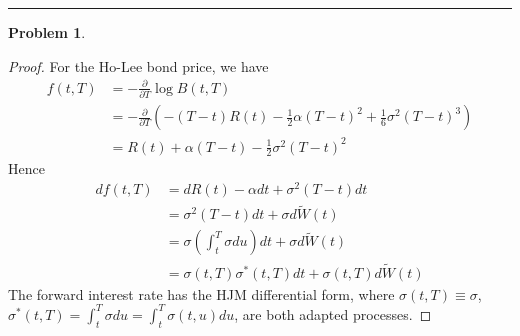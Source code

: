 \documentclass[a4paper, 10pt]{article}
\theoremstyle{definition}
\newtheorem{problem}{Problem}
\theoremstyle{hSol}
\begin{document}
\noindent\rule{16cm}{0.4pt}
\begin{problem} 
\end{problem}
\begin{proof} For the Ho-Lee bond price, we have
\begin{equation}
  \begin{split}
    f(t,T) &= -\frac{\partial }{\partial T}\log B(t,T) \\
    &= -\frac{\partial }{\partial T} \left(-(T-t)R(t)-\frac{1}{2}\alpha (T-t)^2 + \frac{1}{6}\sigma^2(T-t)^3\right) \\
    &= R(t) + \alpha(T-t) - \frac{1}{2}\sigma^2(T-t)^2
  \end{split}
\end{equation}
Hence
\begin{equation}
  \begin{split}
    df(t,T) &= dR(t) - \alpha dt + \sigma^2(T-t) dt  \\
  &= \sigma^2(T-t) dt + \sigma d \widetilde{W}(t) \\ 
  &= \sigma \left(\int_t^T\sigma du\right) dt + \sigma d \widetilde{W}(t)\\
  &= \sigma(t,T)\sigma^*(t,T) dt + \sigma(t,T) d \widetilde{W}(t)
  \end{split}
\end{equation}
The forward interest rate has the HJM differential form, where $\sigma(t,T)\equiv\sigma$, $\sigma^*(t,T) = \int_t^T\sigma du = \int_t^T\sigma(t,u) du$, are both adapted processes.
\end{proof}
\end{document}
